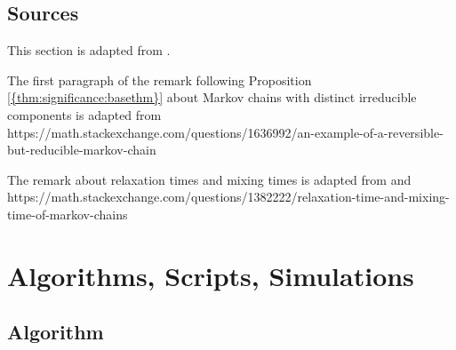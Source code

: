 \documentclass[12pt]{article}
\begin{document}
\subsection*{Sources} This section is adapted from
\cite{Chikina2860, Chikina2019, doi:10.1080/2330443X.2020.1806763}.

    
The first paragraph of the remark following Proposition~%
\ref{{thm:significance:basethm}} about Markov chains with distinct
irreducible components is adapted from
https://math.stackexchange.com/questions/1636992/an-example-of-a-reversible-but-reducible-markov-chain

The remark about relaxation times and mixing times is adapted from
\cite{levin09} and
https://math.stackexchange.com/questions/1382222/relaxation-time-and-mixing-time-of-markov-chains

\hr

\section*{Algorithms, Scripts, Simulations}

\subsection*{Algorithm}
\end{document}
